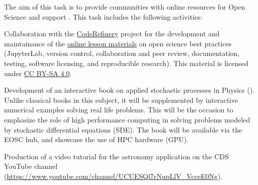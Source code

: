 \begin{task}[
  title=Online resources for open science,
  id=online-resources,
  lead=INSERM,
  PM=14,
  wphases={0-48!.3},
  partners={CDS,EP,QS,SIL,SRL,UPSUD,WTT,XFEL}
]
  The aim of this task is to provide communities with online resources for Open Science and support .
  This task includes the following activities:
  \begin{compactitem}
  \item Collaboration with the \href{https://coderefinery.org}{CodeRefinery} project for the development and maintainance of the \href{https://coderefinery.org/lessons/}{online lesson materials} on open science best practices (JupyterLab, version control, collaboration and peer review, documentation, testing, software licensing, and reproducible research).
  This material is licensed under \href{https://creativecommons.org/licenses/by-sa/4.0/}{CC BY-SA 4.0}.
\item Development of an interactive book on applied stochastic
  processes in Physics (). Unlike classical
  books in this subject, it will be supplemented by interactive
  numerical examples solving real life problems. This will be the
  occasion to emphasize the role of high performance computing in
  solving problems modeled by stochastic differential equations (SDE).
  The book will be available via the EOSC hub, and showcase the use of
  HPC hardware (GPU).
  \item Production of a video tutorial for the astronomy application on the 
      CDS YouTube channel (\url{https://www.youtube.com/channel/UCUESQl7rNupLlV_VcceE0Ng}).
  \end{compactitem}
\end{task}
